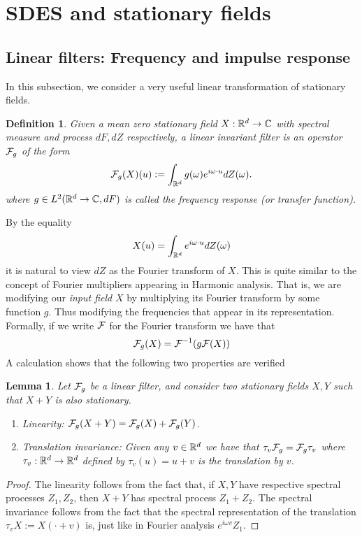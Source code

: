 \documentclass[12pt]{article}
\newtheorem{lemma}{Lemma}
\newtheorem{definition}{Definition}
\begin{document}
\section{SDES and stationary fields}
\subsection{Linear filters: Frequency and impulse response}
In this subsection, we consider a very useful linear transformation of stationary fields.
\begin{definition}\label{frequency response def}
    Given a mean zero stationary field $X:{\mathbb R}^d\to\mathbb{C}$ with spectral measure and process  $dF,dZ$ respectively, a \emph{linear invariant filter} is an operator $\mathcal{F}_g$ of the form
    \begin{equation*}
        \mathcal{F}_g(X)(u):= \int_{{\mathbb R}^d} g(\omega)e^{i\omega\cdot u} dZ(\omega).
    \end{equation*}
    where $g \in L^2({\mathbb R}^d\to\mathbb{C},dF)$ is called the \emph{frequency response} (or \emph{transfer function}).
\end{definition}
By the equality
\begin{equation*}
    X(u)=\int_{{\mathbb R}^d}e^{i\omega\cdot u}dZ(\omega)
\end{equation*}
it is natural to view $dZ$ as the Fourier transform of $X$. This is quite similar to the concept of Fourier multipliers appearing in Harmonic analysis. That is, we are modifying our \emph{input field} $X$ by multiplying its Fourier transform by some function $g$. Thus modifying the frequencies that appear in its representation. Formally, if we write  $\mathcal{F}$ for the Fourier transform we have that
\begin{equation}\label{formal}
    \mathcal{F}_g(X)=\mathcal{F}^{-1}(g\mathcal{F}(X))
\end{equation}
A calculation shows that the following two properties are verified
\begin{lemma}
    Let $\mathcal{F}_g$ be a linear filter, and consider two stationary fields $X, Y$ such that $X+Y$ is also stationary.
    \begin{enumerate}
        \item Linearity: $\mathcal{F}_g(X+Y)=\mathcal{F}_g(X)+\mathcal{F}_g(Y)$.
        \item Translation invariance: Given any $v\in {\mathbb R}^d$ we have that  $\tau_v\mathcal{F}_g= \mathcal{F}_g\tau_v$ where $\tau_v:{\mathbb R}^d\to {\mathbb R}^d$ defined by $\tau_v(u)=u+v$ is the translation by $v$.
    \end{enumerate}
\end{lemma}
\begin{proof}
    The linearity follows from the fact that, if $X, Y$ have respective spectral processes  $Z_1, Z_2$, then  $X+Y$ has spectral process  $Z_1+Z_2$. The spectral invariance follows from the fact that the spectral representation of  the translation $\tau_v X:= X(\cdot +v)$ is, just like in Fourier analysis $e^{i\omega v}Z_1$.
\end{proof}
\end{document}
